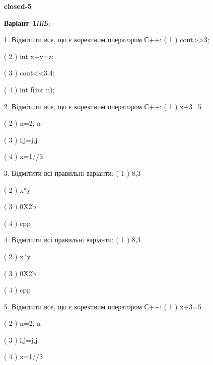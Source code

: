 \documentclass[11pt]{article}
\begin{document}
{\large\textbf{closed-5}}

\textbf{Варіант \No\,1}\hfill \textit{ПІБ:}\,\underline{\hspace{60mm}}
\vspace{4mm}

1. Відмітити все, що є коректним оператором С++:
( 1 ) cout>>3;

( 2 ) int x+y=z;

( 3 ) cout<<3.4;

( 4 ) int f(int n);

2. Відмітити все, що є коректним оператором С++:
( 1 ) x+3=5

( 2 ) n=2; n--

( 3 ) i,j=j,j

( 4 ) x=1//3

3. Відмітити всі правильні варіанти:
( 1 ) 8,3

( 2 ) x*y

( 3 ) 0X2b

( 4 ) cpp

4. Відмітити всі правильні варіанти:
( 1 ) 8,3

( 2 ) x*y

( 3 ) 0X2b

( 4 ) cpp

5. Відмітити все, що є коректним оператором С++:
( 1 ) x+3=5

( 2 ) n=2; n--

( 3 ) i,j=j,j

( 4 ) x=1//3






\newpage
\end{document}
